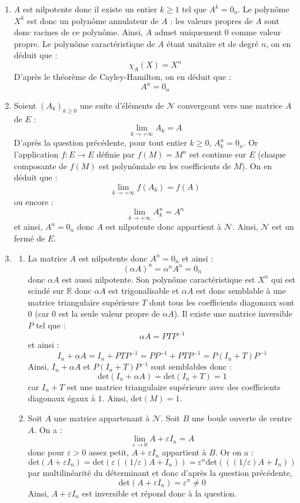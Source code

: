 \documentclass[a4paper,10pt]{report}
\begin{document}
\begin{enumerate}
\item $A$ est nilpotente donc il existe un entier $k \geq 1$ tel que $A^k=0_n$. Le polynôme $X^k$ est donc un polynôme annulateur de $A$ : les valeurs propres de $A$ sont donc racines de ce polynôme. Ainsi, $A$ admet uniquement $0$ comme valeur propre. Le polynôme caractéristique de $A$ étant unitaire et de degré $n$, on en déduit que :
$$ \chi_A(X)=X^n$$
D'après le théorème de Cayley-Hamilton, on en déduit que :
$$ A^n=0_n$$
\item Soient $(A_k)_{k \geq 0}$ une suite d'éléments de $\mathcal{N}$ convergeant vers une matrice $A$ de $E$ :
$$ \lim_{k \rightarrow + \infty} A_k = A$$
D'après la question précédente, pour tout entier $k \geq 0$, $A_k^n=0_n$. Or l'application $f : E \rightarrow E$ définie par $f(M)=M^n$ est continue sur $E$ (chaque composante de $f(M)$ est polynômiale en les coefficients de $M$). On en déduit que :
$$ \lim_{k \rightarrow + \infty} f(A_k) = f(A)$$
ou encore :
$$ \lim_{k \rightarrow + \infty} A_k^n = A^n$$
et ainsi, $A^n=0_n$ donc $A$ est nilpotente donc appartient à $\mathcal{N}$. Ainsi, $\mathcal{N}$ est un fermé de $E$.
\item

\begin{enumerate}
\item La matrice $A$ est nilpotente donc $A^n=0_n$ et ainsi :
$$( \alpha A)^n = \alpha^n A^n = 0_n$$
donc $\alpha A$ est aussi nilpotente. Son polynôme caractéristique est $X^n$ qui est scindé sur $\mathbb{R}$ donc $\alpha A$ est trigonalisable et $\alpha A$ est donc semblable à une matrice triangulaire supérieure $T$ dont tous les coefficients diagonaux sont $0$ (car $0$ est la seule valeur propre de $\alpha A$). Il existe une matrice inversible $P$ tel que :
$$ \alpha A = P TP^{-1}$$
et ainsi :
$$ I_n+ \alpha A = I_n + PTP^{-1} = PP^{-1}+ PTP^{-1} = P(I_n+ T)P^{-1}$$
Ainsi, $I_n+ \alpha A$ et $P(I_n+ T)P^{-1}$ sont semblables donc :
$$ \textrm{det}(I_n+ \alpha A) = \textrm{det}(I_n+ T)=1$$
car $I_n+T$ est une matrice triangulaire supérieure avec des coefficients diagonaux égaux à $1$.
Ainsi, $\textrm{det}(M)=1$.
\item Soit $A$ une matrice appartenant à $\mathcal{N}$. Soit $B$ une boule ouverte de centre $A$. On a :
$$ \lim_{\varepsilon \rightarrow 0} A+ \varepsilon I_n = A$$
donc pour $\varepsilon>0$ assez petit, $A+ \varepsilon I_n$ appartient à $B$. Or on a :
$$ \textrm{det}(A+ \varepsilon I_n) = \textrm{det}(\varepsilon((1/\varepsilon)A+  I_n)) = \varepsilon^n \textrm{det}(((1/\varepsilon)A+  I_n))$$
par multilinéarité du déterminant et donc d'après la question précédente,
$$ \textrm{det}(A+ \varepsilon I_n)  = \varepsilon^n \neq 0$$
Ainsi, $A+ \varepsilon I_n$ est inversible et répond donc à la question.


\end{enumerate}
\end{enumerate}
\end{document}
